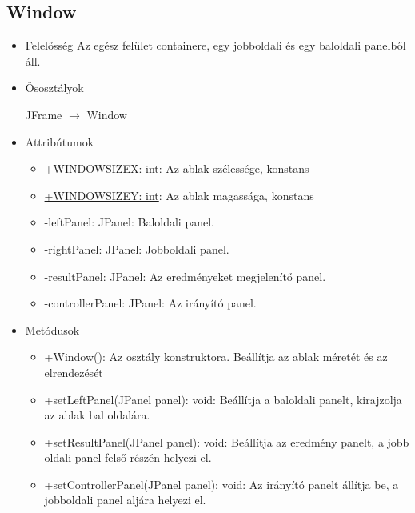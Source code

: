\subsection{Window}
\begin{itemize}
	\item Felelősség\newline
	Az egész felület containere, egy jobboldali és egy baloldali panelből áll.
	\item Ősosztályok\newline

		JFrame $\rightarrow$ Window
		
	\item Attribútumok
	\begin{itemize}
		\item \underline{+WINDOWSIZEX: int}: Az ablak szélessége, konstans
		\item \underline{+WINDOWSIZEY: int}: Az ablak magassága, konstans
		\item -leftPanel: JPanel: Baloldali panel.
		\item -rightPanel: JPanel: Jobboldali panel.
		\item -resultPanel: JPanel: Az eredményeket megjelenítő panel.
		\item -controllerPanel: JPanel: Az irányító panel.
	\end{itemize}
	\item Metódusok
	\begin{itemize}
		\item +Window(): Az osztály konstruktora. Beállítja az ablak méretét és az elrendezését
		\item +setLeftPanel(JPanel panel): void: Beállítja a baloldali panelt, kirajzolja az ablak bal oldalára.
		\item +setResultPanel(JPanel panel): void: Beállítja az eredmény panelt, a jobb oldali panel felső részén helyezi el.
		\item +setControllerPanel(JPanel panel): void: Az irányító panelt állítja be, a jobboldali panel aljára helyezi el.
	\end{itemize}
\end{itemize}

